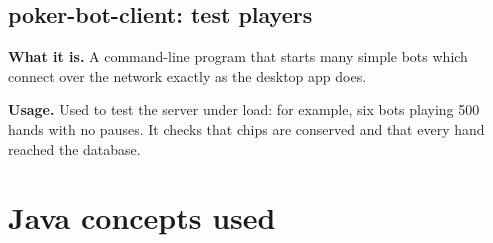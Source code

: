 \documentclass[12pt,a4paper]{article}
\begin{document}
\subsection{poker-bot-client: test players}
\textbf{What it is.} A command-line program that starts many simple bots which connect over the
network exactly as the desktop app does.

\textbf{Usage.} Used to test the server under load: for example, six bots playing 500 hands
with no pauses. It checks that chips are conserved and that every hand reached the database.

\section{Java concepts used}
\end{document}
